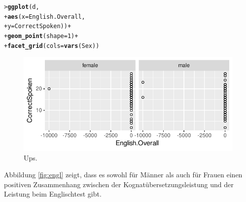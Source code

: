 \documentclass[oneside, 10pt]{book}\usepackage[]{graphicx}\usepackage[]{xcolor}
\makeatletter
\newcommand{\hlnum}[1]{\textcolor[rgb]{0.686,0.059,0.569}{#1}}%
\newcommand{\hlopt}[1]{\textcolor[rgb]{0,0,0}{#1}}%
\newcommand{\hlstd}[1]{\textcolor[rgb]{0.345,0.345,0.345}{#1}}%
\newcommand{\hlkwc}[1]{\textcolor[rgb]{0.333,0.667,0.333}{#1}}%
\newcommand{\hlkwd}[1]{\textcolor[rgb]{0.737,0.353,0.396}{\textbf{#1}}}%
\newenvironment{kframe}{%
 \def\at@end@of@kframe{}%
 \ifinner\ifhmode%
  \def\at@end@of@kframe{\end{minipage}}%
  \begin{minipage}{\columnwidth}%
 \fi\fi%
 \def\FrameCommand##1{\hskip\@totalleftmargin \hskip-\fboxsep
 \colorbox{shadecolor}{##1}\hskip-\fboxsep
     \hskip-\linewidth \hskip-\@totalleftmargin \hskip\columnwidth}%
 \MakeFramed {\advance\hsize-\width
   \@totalleftmargin\z@ \linewidth\hsize
   \@setminipage}}%
 {\par\unskip\endMakeFramed%
 \at@end@of@kframe}
\newenvironment{knitrout}{}{} %
\makeatother
\begin{document}
\begin{knitrout}
\color{fgcolor}\begin{kframe}
\begin{alltt}
\hlstd{> }\hlkwd{ggplot}\hlstd{(d,}
\hlstd{+ }       \hlkwd{aes}\hlstd{(}\hlkwc{x} \hlstd{= English.Overall,}
\hlstd{+ }           \hlkwc{y} \hlstd{= CorrectSpoken))} \hlopt{+}
\hlstd{+ }  \hlkwd{geom_point}\hlstd{(}\hlkwc{shape} \hlstd{=} \hlnum{1}\hlstd{)} \hlopt{+}
\hlstd{+ }  \hlkwd{facet_grid}\hlstd{(}\hlkwc{cols} \hlstd{=} \hlkwd{vars}\hlstd{(Sex))}
\end{alltt}
\end{kframe}\begin{figure}[tp]

{\centering \includegraphics[width=.7\textwidth]{figs/unnamed-chunk-294-1} 

}

\caption{Ups.\label{fig:oops}}\label{fig:unnamed-chunk-294}
\end{figure}

\end{knitrout}

Abbildung \ref{fig:engl} zeigt, dass es sowohl für Männer als auch für Frauen
einen positiven Zusammenhang zwischen der Kognatübersetzungsleistung
und der Leistung beim Englischtest gibt.
\end{document}
